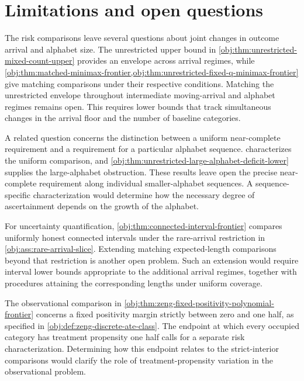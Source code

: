 \section{Limitations and open questions}
\label{sec:discussion-limitations-and-open-questions}

The risk comparisons leave several questions about joint changes in outcome arrival and alphabet size. The unrestricted upper bound in \cref{obj:thm:unrestricted-mixed-count-upper} provides an envelope across arrival regimes, while \cref{obj:thm:matched-minimax-frontier,obj:thm:unrestricted-fixed-q-minimax-frontier} give matching comparisons under their respective conditions. Matching the unrestricted envelope throughout intermediate moving-arrival and alphabet regimes remains open. This requires lower bounds that track simultaneous changes in the arrival floor and the number of baseline categories.

A related question concerns the distinction between a uniform near-complete requirement and a requirement for a particular alphabet sequence.  characterizes the uniform comparison, and \cref{obj:thm:unrestricted-large-alphabet-deficit-lower} supplies the large-alphabet obstruction. These results leave open the precise near-complete requirement along individual smaller-alphabet sequences. A sequence-specific characterization would determine how the necessary degree of ascertainment depends on the growth of the alphabet.

For uncertainty quantification, \cref{obj:thm:connected-interval-frontier} compares uniformly honest connected intervals under the rare-arrival restriction in \cref{obj:ass:rare-arrival-slice}. Extending matching expected-length comparisons beyond that restriction is another open problem. Such an extension would require interval lower bounds appropriate to the additional arrival regimes, together with procedures attaining the corresponding lengths under uniform coverage.

The observational comparison in \cref{obj:thm:zeng-fixed-positivity-polynomial-frontier} concerns a fixed positivity margin strictly between zero and one half, as specified in \cref{obj:def:zeng-discrete-ate-class}. The endpoint at which every occupied category has treatment propensity one half calls for a separate risk characterization. Determining how this endpoint relates to the strict-interior comparisons would clarify the role of treatment-propensity variation in the observational problem.

